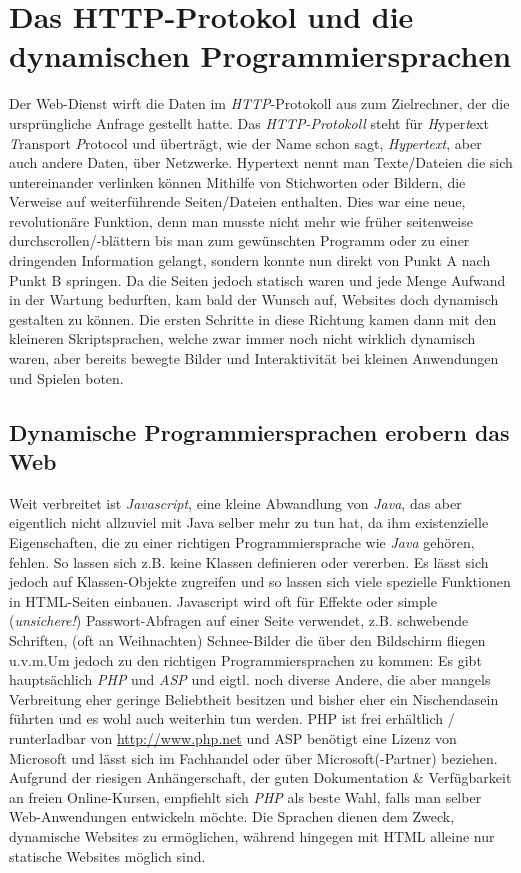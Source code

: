 \documentclass[b5paper,10pt,dvips,fleqn,titlepage,twoside]{book}
\begin{document}
\chapter{Das HTTP-Protokol und die dynamischen Programmiersprachen}

Der Web-Dienst wirft die Daten im \emph{HTTP}-Protokoll aus zum Zielrechner, der die ursprüngliche Anfrage gestellt hatte. Das \emph{HTTP-Protokoll} steht für \emph{H}yper\emph{t}ext \emph{T}ransport \emph{P}rotocol und überträgt, wie der Name schon sagt, \emph{Hypertext}, aber auch andere Daten, über Netzwerke. Hypertext nennt man Texte/Dateien die sich untereinander verlinken können Mithilfe von Stichworten oder Bildern, die Verweise auf weiterführende Seiten/Dateien enthalten. Dies war eine neue, revolutionäre Funktion, denn man musste nicht mehr wie früher seitenweise durchscrollen/-blättern bis man zum gewünschten Programm oder zu einer dringenden Information gelangt, sondern konnte nun direkt von Punkt A nach Punkt B springen. Da die Seiten jedoch statisch waren und jede Menge Aufwand in der Wartung bedurften, kam bald der Wunsch auf, Websites doch dynamisch gestalten zu können. Die ersten Schritte in diese Richtung kamen dann mit den kleineren Skriptsprachen, welche zwar immer noch nicht wirklich dynamisch waren, aber bereits bewegte Bilder und Interaktivität bei kleinen Anwendungen und Spielen boten.
\section{Dynamische Programmiersprachen erobern das Web}
Weit verbreitet ist \emph{Javascript}, eine kleine Abwandlung von \emph{Java}, das aber eigentlich nicht allzuviel mit Java selber mehr zu tun hat, da ihm existenzielle Eigenschaften, die zu einer richtigen Programmiersprache wie \emph{Java} gehören, fehlen. 
So lassen sich z.B. keine Klassen definieren oder vererben. Es lässt sich jedoch auf Klassen-Objekte zugreifen und so lassen sich viele spezielle Funktionen in HTML-Seiten einbauen. Javascript wird oft für Effekte oder simple (\emph{unsichere!}) Passwort-Abfragen auf einer Seite verwendet, z.B. schwebende Schriften, (oft an Weihnachten) Schnee-Bilder die über den Bildschirm fliegen u.v.m.\newline Um jedoch zu den richtigen Programmiersprachen zu kommen: Es gibt hauptsächlich \emph{PHP} und \emph{ASP} und eigtl. noch diverse Andere, die aber mangels Verbreitung eher geringe Beliebtheit besitzen und bisher eher ein Nischendasein führten und es wohl auch weiterhin tun werden. PHP ist frei erhältlich / runterladbar von \url{http://www.php.net} und ASP benötigt eine Lizenz von Microsoft und lässt sich im Fachhandel oder über Microsoft(-Partner) beziehen. Aufgrund der riesigen Anhängerschaft, der guten Dokumentation \& Verfügbarkeit an freien Online-Kursen, empfiehlt sich \emph{PHP} als beste Wahl, falls man selber Web-Anwendungen entwickeln möchte. Die Sprachen dienen dem Zweck, dynamische Websites zu ermöglichen, während hingegen mit HTML alleine nur statische Websites möglich sind. \newline
\end{document}
